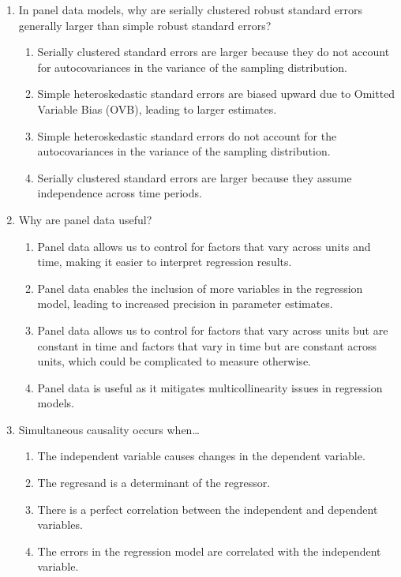 \documentclass{article}
\begin{document}
\begin{enumerate}[label=\textbf{\arabic*.}]
    \item In panel data models, why are serially clustered robust standard errors generally larger than simple robust standard errors?
    \begin{enumerate}[label=\Alph*)]
        \item Serially clustered standard errors are larger because they do not account for autocovariances in the variance of the sampling distribution.
        \item Simple heteroskedastic standard errors are biased upward due to Omitted Variable Bias (OVB), leading to larger estimates.
        \item Simple heteroskedastic standard errors do not account for the autocovariances in the variance of the sampling distribution. %
        \item Serially clustered standard errors are larger because they assume independence across time periods.
    \end{enumerate}

    \item Why are panel data useful?
    \begin{enumerate}[label=\Alph*)]
        \item Panel data allows us to control for factors that vary across units and time, making it easier to interpret regression results.
        \item Panel data enables the inclusion of more variables in the regression model, leading to increased precision in parameter estimates.
        \item Panel data allows us to control for factors that vary across units but are constant in time and factors that vary in time but are constant across units, which could be complicated to measure otherwise. %
        \item Panel data is useful as it mitigates multicollinearity issues in regression models.
    \end{enumerate}

    \item Simultaneous causality occurs when…
    \begin{enumerate}[label=\Alph*)]
        \item The independent variable causes changes in the dependent variable.
        \item The regresand is a determinant of the regressor. %
        \item There is a perfect correlation between the independent and dependent variables.
        \item The errors in the regression model are correlated with the independent variable.
    \end{enumerate}


\end{enumerate}
\end{document}
